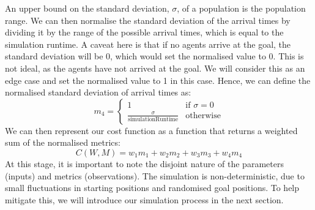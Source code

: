 \documentclass[12pt]{article}
\begin{document}
An upper bound on the standard deviation, $\sigma$, of a population is the population range. We can then normalise the standard deviation of the arrival times by dividing it by the range of the possible arrival times, which is equal to the simulation runtime. A caveat here is that if no agents arrive at the goal, the standard deviation will be 0, which would set the normalised value to 0. This is not ideal, as the agents have not arrived at the goal. We will consider this as an edge case and set the normalised value to 1 in this case. Hence, we can define the normalised standard deviation of arrival times as:
\begin{equation}
    m_4 = \begin{cases}
        1 & \text{if } \sigma = 0 \\
        \frac{\sigma}{\text{simulationRuntime}} & \text{otherwise}
    \end{cases}
\end{equation}
We can then represent our cost function as a function that returns a weighted sum of the normalised metrics:
\begin{equation}
    C(W,M) = w_1m_1 + w_2m_2 + w_3m_3 + w_4m_4
\end{equation}
At this stage, it is important to note the disjoint nature of the parameters (inputs) and metrics (observations). The simulation is non-deterministic, due to small fluctuations in starting positions and randomised goal positions. To help mitigate this, we will introduce our simulation process in the next section.
\end{document}
